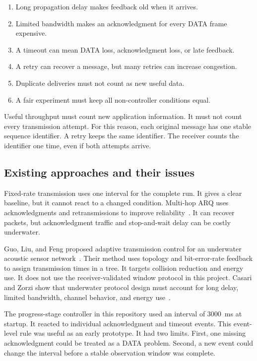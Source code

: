\documentclass[11pt]{article}
\begin{document}
\begin{enumerate}\setlength{\itemsep}{2pt}
  \item Long propagation delay makes feedback old when it arrives.
  \item Limited bandwidth makes an acknowledgment for every DATA frame expensive.
  \item A timeout can mean DATA loss, acknowledgment loss, or late feedback.
  \item A retry can recover a message, but many retries can increase congestion.
  \item Duplicate deliveries must not count as new useful data.
  \item A fair experiment must keep all non-controller conditions equal.
\end{enumerate}

Useful throughput must count new application information.
It must not count every transmission attempt.
For this reason, each original message has one stable sequence identifier.
A retry keeps the same identifier.
The receiver counts the identifier one time, even if both attempts arrive.

\clearpage
\subsection{Existing approaches and their issues}\label{sec:existing}
\noindent
Fixed-rate transmission uses one interval for the complete run.
It gives a clear baseline, but it cannot react to a changed condition.
Multi-hop ARQ uses acknowledgments and retransmissions to improve reliability~\cite{tan2007}.
It can recover packets, but acknowledgment traffic and stop-and-wait delay can be costly underwater.

Guo, Liu, and Feng proposed adaptive transmission control for an underwater acoustic sensor network~\cite{guo2008}.
Their method uses topology and bit-error-rate feedback to assign transmission times in a tree.
It targets collision reduction and energy use.
It does not use the receiver-validated window protocol in this project.
Casari and Zorzi show that underwater protocol design must account for long delay, limited bandwidth, channel behavior, and energy use~\cite{casari2011}.

The progress-stage controller in this repository used an interval of 3000~ms at startup.
It reacted to individual acknowledgment and timeout events.
This event-level rule was useful as an early prototype.
It had two limits.
First, one missing acknowledgment could be treated as a DATA problem.
Second, a new event could change the interval before a stable observation window was complete.
\end{document}
